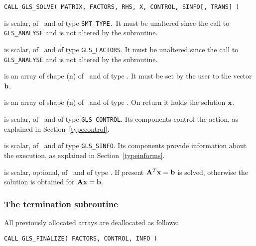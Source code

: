 \documentclass{galahad}
\newcommand{\packagename}{GLS}
\begin{document}
\hspace{8mm}
{\tt CALL \packagename\_SOLVE( MATRIX, FACTORS, RHS, X, CONTROL,
SINFO[, TRANS] )}

\begin{description}

 is scalar, of \intentin\ and of type {\tt SMT\_TYPE.}  It
must be unaltered since the call to {\tt \packagename\_ANALYSE} and is
not altered by the subroutine.

 is scalar, of \intentin\ and of type {\tt \packagename\_FACTORS}.
It must be unaltered since the call to {\tt \packagename\_ANALYSE} and is
not altered by the subroutine.

 is an array of shape ({n}) of \intentin\ and of type \realdp.
It must be set by the user to the vector ${\mathbf{b}}$.

 is an array of shape ({n}) of \intentout\ and of type \realdp.
On return it holds the solution ${\mathbf{x}}$.

 is scalar, of \intentin\ and of type {\tt \packagename\_CONTROL}.
Its components control the action, as explained in
Section~\ref{typecontrol}.

 is scalar, of \intentout\ and of type {\tt \packagename\_SINFO}.
Its components provide information about the execution, as explained in
Section~\ref{typeinforms}.

 is scalar, optional, of \intentin\ and of type \integer.
If present ${\mathbf{A}}^T {\mathbf{x}} = {\mathbf{b}}$ is solved, otherwise the solution
is obtained for ${\mathbf{A}} {\mathbf{x}} = {\mathbf{b}}$.

\end{description}


\subsubsection{The termination subroutine}
All previously allocated arrays are deallocated as follows:

\hspace{8mm}
{\tt CALL \packagename\_FINALIZE( FACTORS, CONTROL, INFO )}
\end{document}
